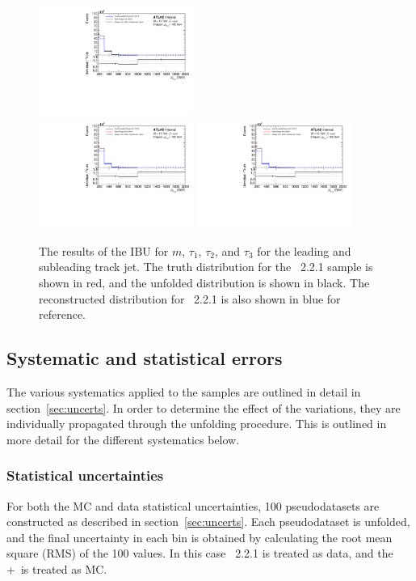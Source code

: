 \begin{figure}
  \includegraphics[page=97,width=0.45\textwidth]{figures/IBUPlots.pdf} \\
  \includegraphics[page=91,width=0.45\textwidth]{figures/IBUPlots.pdf}
  \includegraphics[page=98,width=0.45\textwidth]{figures/IBUPlots.pdf}
  \caption{The results of the IBU for $m$, $\tau_1$, $\tau_2$, and $\tau_3$ for the leading and subleading track jet. The truth distribution for the \sherpa~2.2.1 sample is shown in red, and the unfolded distribution is shown in black. The reconstructed distribution for \sherpa~2.2.1 is also shown in blue for reference.}
  \label{fig:UnfoldIBUTJ2}
\end{figure}
\clearpage

\subsection{Systematic and statistical errors}
The various systematics applied to the samples are outlined in detail in section~\ref{sec:uncerts}. In order to determine the effect of the variations, they are individually propagated through the unfolding procedure. This is outlined in more detail for the different systematics below.
\subsubsection{Statistical uncertainties}
For both the MC and data statistical uncertainties, 100 pseudodatasets are constructed as described in section~\ref{sec:uncerts}. Each pseudodataset is unfolded, and the final uncertainty in each bin is obtained by calculating the root mean square (RMS) of the 100 values. In this case \sherpa~2.2.1 is treated as data, and the \powheg+\pythia~is treated as MC.

